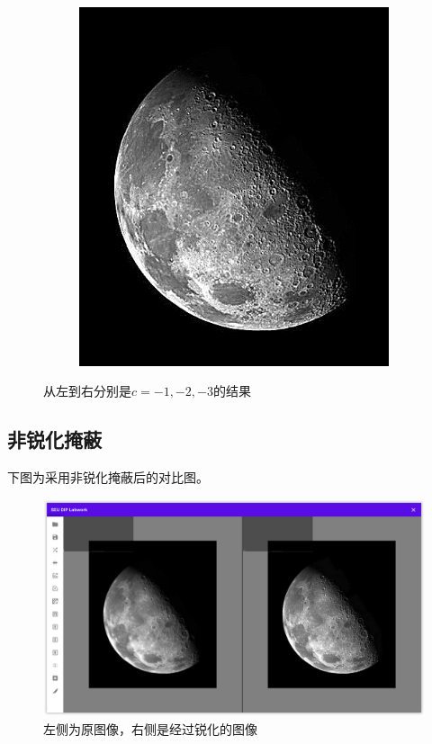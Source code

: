 \documentclass{article}
\begin{document}
\begin{figure}[htbp]
\begin{subfigure}{.3\textwidth}
    \end{subfigure}
    \begin{subfigure}{.3\textwidth}
        \includegraphics[width=\linewidth]{img/laplace/3.png}
    \end{subfigure}
    \caption{从左到右分别是$c=-1, -2, -3$的结果}
\end{figure}

\newpage

\subsection{非锐化掩蔽}

下图为采用非锐化掩蔽后的对比图。

\begin{figure}[H]
    \includegraphics[width=\textwidth]{img/usm.png}
    \caption{左侧为原图像，右侧是经过锐化的图像}
\end{figure}
\end{document}
